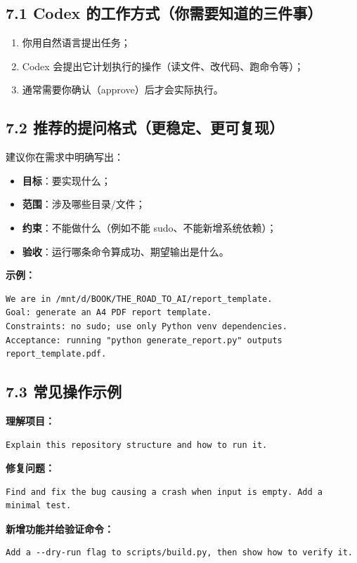 \documentclass[11pt,a4paper]{article}
\begin{document}
\subsection{7.1 Codex 的工作方式（你需要知道的三件事）}
\begin{enumerate}[leftmargin=1.7em]
  \item 你用自然语言提出任务；
  \item Codex 会提出它计划执行的操作（读文件、改代码、跑命令等）；
  \item 通常需要你确认（approve）后才会实际执行。
\end{enumerate}

\subsection{7.2 推荐的提问格式（更稳定、更可复现）}
建议你在需求中明确写出：
\begin{itemize}[leftmargin=1.5em]
  \item \textbf{目标}：要实现什么；
  \item \textbf{范围}：涉及哪些目录/文件；
  \item \textbf{约束}：不能做什么（例如不能 sudo、不能新增系统依赖）；
  \item \textbf{验收}：运行哪条命令算成功、期望输出是什么。
\end{itemize}

\textbf{示例：}
\begin{lstlisting}
We are in /mnt/d/BOOK/THE_ROAD_TO_AI/report_template.
Goal: generate an A4 PDF report template.
Constraints: no sudo; use only Python venv dependencies.
Acceptance: running "python generate_report.py" outputs report_template.pdf.
\end{lstlisting}

\subsection{7.3 常见操作示例}
\textbf{理解项目：}
\begin{lstlisting}
Explain this repository structure and how to run it.
\end{lstlisting}
\textbf{修复问题：}
\begin{lstlisting}
Find and fix the bug causing a crash when input is empty. Add a minimal test.
\end{lstlisting}
\textbf{新增功能并给验证命令：}
\begin{lstlisting}
Add a --dry-run flag to scripts/build.py, then show how to verify it.
\end{lstlisting}
\end{document}

